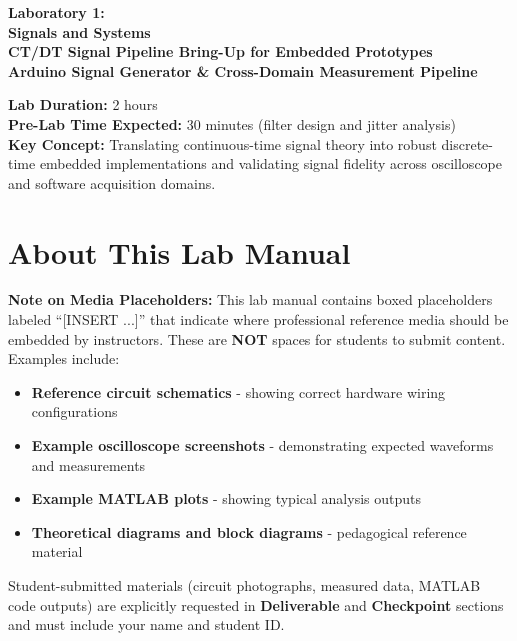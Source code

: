 \documentclass[11pt,letterpaper]{article}
\begin{document}
\begin{center}
\huge{\bf Laboratory 1:}\\
\vspace{0.2in}
\Large{\bf Signals and Systems}\\
\Large{\bf CT/DT Signal Pipeline Bring-Up for Embedded Prototypes}\\
\vspace{0.2in}
\normalsize{\bf Arduino Signal Generator \& Cross-Domain Measurement Pipeline}
\end{center}

\vspace{0.3in}
\noindent
\textbf{Lab Duration:} 2 hours\\
\textbf{Pre-Lab Time Expected:} 30 minutes (filter design and jitter analysis)\\
\textbf{Key Concept:} Translating continuous-time signal theory into robust discrete-time embedded implementations and validating signal fidelity across oscilloscope and software acquisition domains.

\tableofcontents
\clearpage

\section*{About This Lab Manual}

\textbf{Note on Media Placeholders:} This lab manual contains boxed placeholders labeled ``[INSERT ...]'' that indicate where professional reference media should be embedded by instructors. These are \textbf{NOT} spaces for students to submit content. Examples include:

\begin{itemize}
    \item \textbf{Reference circuit schematics} - showing correct hardware wiring configurations
    \item \textbf{Example oscilloscope screenshots} - demonstrating expected waveforms and measurements
    \item \textbf{Example MATLAB plots} - showing typical analysis outputs
    \item \textbf{Theoretical diagrams and block diagrams} - pedagogical reference material
\end{itemize}

\noindent Student-submitted materials (circuit photographs, measured data, MATLAB code outputs) are explicitly requested in \textbf{Deliverable} and \textbf{Checkpoint} sections and must include your name and student ID.
\end{document}
